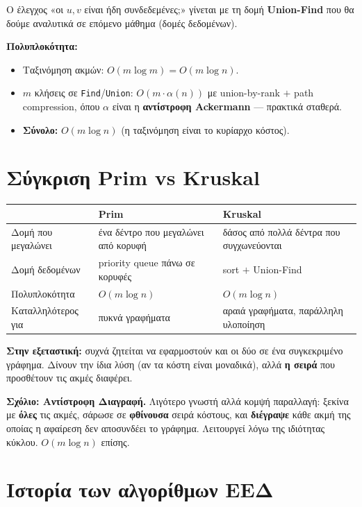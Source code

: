 \documentclass[11pt,a4paper]{article}
\begin{document}
Ο έλεγχος «οι $u, v$ είναι ήδη συνδεδεμένες;» γίνεται με τη δομή
\textbf{Union-Find} που θα δούμε αναλυτικά σε επόμενο μάθημα (δομές δεδομένων).

\textbf{Πολυπλοκότητα:}
\begin{itemize}
  \item Ταξινόμηση ακμών: $O(m \log m) = O(m \log n)$.
  \item $m$ κλήσεις σε \texttt{Find}/\texttt{Union}: $O(m \cdot \alpha(n))$ με
  union-by-rank $+$ path compression, όπου $\alpha$ είναι η \textbf{αντίστροφη
  Ackermann} --- πρακτικά σταθερά.
  \item \textbf{Σύνολο:} $O(m \log n)$ (η ταξινόμηση είναι το κυρίαρχο κόστος).
\end{itemize}

\section{Σύγκριση Prim vs Kruskal}

\begin{center}
\begin{tabular}{@{}l p{4.6cm} p{4.6cm}@{}}
\toprule
 & \textbf{Prim} & \textbf{Kruskal} \\
\midrule
Δομή που μεγαλώνει & ένα δέντρο που μεγαλώνει από κορυφή & δάσος από πολλά
δέντρα που συγχωνεύονται \\
Δομή δεδομένων & priority queue πάνω σε κορυφές & sort $+$ Union-Find \\
Πολυπλοκότητα & $O(m \log n)$ & $O(m \log n)$ \\
Καταλληλότερος για & πυκνά γραφήματα & αραιά γραφήματα, παράλληλη υλοποίηση \\
\bottomrule
\end{tabular}
\end{center}

\textbf{Στην εξεταστική:} συχνά ζητείται να εφαρμοστούν και οι δύο σε ένα
συγκεκριμένο γράφημα. Δίνουν την ίδια λύση (αν τα κόστη είναι μοναδικά), αλλά
\textbf{η σειρά} που προσθέτουν τις ακμές διαφέρει.

\textbf{Σχόλιο: Αντίστροφη Διαγραφή.} Λιγότερο γνωστή αλλά κομψή παραλλαγή:
ξεκίνα με \textbf{όλες} τις ακμές, σάρωσε σε \textbf{φθίνουσα} σειρά κόστους, και
\textbf{διέγραψε} κάθε ακμή της οποίας η αφαίρεση δεν αποσυνδέει το γράφημα.
Λειτουργεί λόγω της ιδιότητας κύκλου. $O(m \log n)$ επίσης.

\section{Ιστορία των αλγορίθμων ΕΕΔ}
\end{document}
